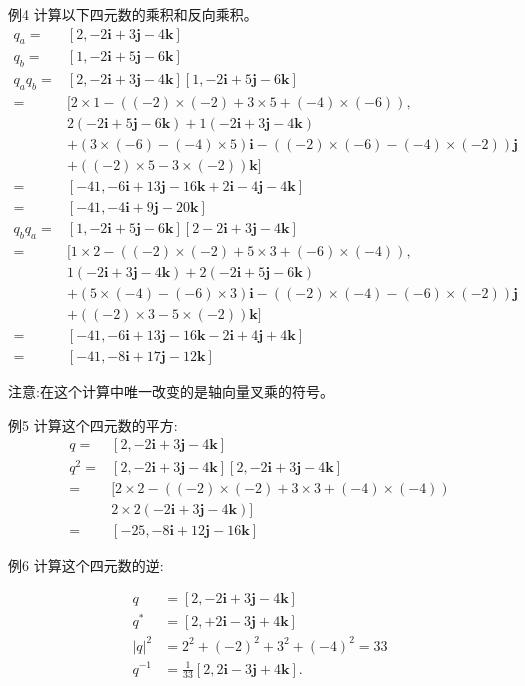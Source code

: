 例4 计算以下四元数的乘积和反向乘积。
$$
\begin{aligned}
q_{a}= & {[2,-2 \mathbf{i}+3 \mathbf{j}-4 \mathbf{k}] } \\
q_{b}= & {[1,-2 \mathbf{i}+5 \mathbf{j}-6 \mathbf{k}] } \\
q_{a} q_{b}= & {[2,-2 \mathbf{i}+3 \mathbf{j}-4 \mathbf{k}][1,-2 \mathbf{i}+5 \mathbf{j}-6 \mathbf{k}] } \\
= & {[2 \times 1-((-2) \times(-2)+3 \times 5+(-4) \times(-6)),} \\
& 2(-2 \mathbf{i}+5 \mathbf{j}-6 \mathbf{k})+1(-2 \mathbf{i}+3 \mathbf{j}-4 \mathbf{k}) \\
& +(3 \times(-6)-(-4) \times 5) \mathbf{i}-((-2) \times(-6)-(-4) \times(-2)) \mathbf{j} \\
& +((-2) \times 5-3 \times(-2)) \mathbf{k}] \\
= & {[-41,-6 \mathbf{i}+13 \mathbf{j}-16 \mathbf{k}+2 \mathbf{i}-4 \mathbf{j}-4 \mathbf{k}] } \\
= & {[-41,-4 \mathbf{i}+9 \mathbf{j}-20 \mathbf{k}] }\\
q_{b} q_{a}= & {[1,-2 \mathbf{i}+5 \mathbf{j}-6 \mathbf{k}][2-2 \mathbf{i}+3 \mathbf{j}-4 \mathbf{k}] } \\
= & {[1 \times 2-((-2) \times(-2)+5 \times 3+(-6) \times(-4)),} \\
& 1(-2 \mathbf{i}+3 \mathbf{j}-4 \mathbf{k})+2(-2 \mathbf{i}+5 \mathbf{j}-6 \mathbf{k}) \\
& +(5 \times(-4)-(-6) \times 3) \mathbf{i}-((-2) \times(-4)-(-6) \times(-2)) \mathbf{j} \\
& +((-2) \times 3-5 \times(-2)) \mathbf{k}] \\
= & {[-41,-6 \mathbf{i}+13 \mathbf{j}-16 \mathbf{k}-2 \mathbf{i}+4 \mathbf{j}+4 \mathbf{k}] } \\
= & {[-41,-8 \mathbf{i}+17 \mathbf{j}-12 \mathbf{k}] }
\end{aligned}
$$

注意:在这个计算中唯一改变的是轴向量叉乘的符号。

例5 计算这个四元数的平方:
$$
\begin{aligned}
q= & {[2,-2 \mathbf{i}+3 \mathbf{j}-4 \mathbf{k}] } \\
q^{2}= & {[2,-2 \mathbf{i}+3 \mathbf{j}-4 \mathbf{k}][2,-2 \mathbf{i}+3 \mathbf{j}-4 \mathbf{k}] } \\
= & {[2 \times 2-((-2) \times(-2)+3 \times 3+(-4) \times(-4))} \\
& 2 \times 2(-2 \mathbf{i}+3 \mathbf{j}-4 \mathbf{k})] \\
= & {[-25,-8 \mathbf{i}+12 \mathbf{j}-16 \mathbf{k}] }
\end{aligned}
$$

例6 计算这个四元数的逆:

$$
\begin{aligned}
q & =[2,-2 \mathbf{i}+3 \mathbf{j}-4 \mathbf{k}] \\
q^{*} & =[2,+2 \mathbf{i}-3 \mathbf{j}+4 \mathbf{k}] \\
|q|^{2} & =2^{2}+(-2)^{2}+3^{2}+(-4)^{2}=33 \\
q^{-1} & =\frac{1}{33}[2,2 \mathbf{i}-3 \mathbf{j}+4 \mathbf{k}] .
\end{aligned}
$$
